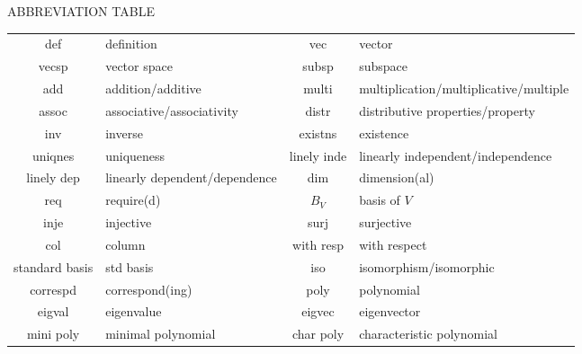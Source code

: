 {\begin{center}
\vspace{24pt}
{\Large A{\normalsize BBREVIATION} T{\normalsize ABLE}}\vspace{8pt}\par
\begin{tabularx}{0.95\textwidth}{
		| c |
		| >{\raggedright\arraybackslash}X | c |
		| >{\raggedright\arraybackslash}X| }
	\hline
def&			definition & vec&			vector\\
vecsp&			vector space & subsp&			subspace\\
add&			addition/additive & multi&			multiplication/multiplicative/multiple\\
assoc&			associative/associativity & distr&			distributive properties/property\\
inv&			inverse & existns&		existence\\
uniqnes&		uniqueness & linely inde&	linearly independent/independence\\
linely dep&		linearly dependent/dependence & dim&			dimension(al)\\
req& require(d) & $B_V$ & basis of $V$\\
inje&			injective & surj&			surjective\\
col&			column & with resp&		with respect\\
standard basis& std basis & iso&			isomorphism/isomorphic\\
correspd&		correspond(ing) & poly&			polynomial\\
eigval&			eigenvalue & eigvec&			eigenvector\\
mini poly&		minimal polynomial & char poly&		characteristic polynomial\\\hline
\end{tabularx}
\end{center}

\clearpage
}{}

\begin{large}


%

\end{large}


